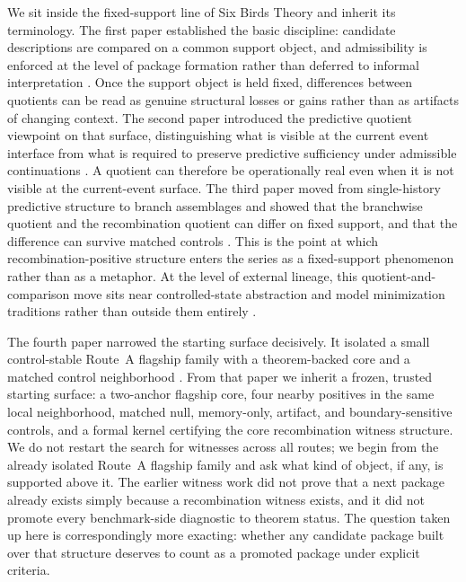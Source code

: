 \documentclass[11pt]{article}
\theoremstyle{definition}
\begin{document}
We sit inside the fixed-support line of Six Birds Theory and inherit its terminology. The first paper established the basic discipline: candidate descriptions are compared on a common support object, and admissibility is enforced at the level of package formation rather than deferred to informal interpretation \citep{Tsiokos2026EventPackages}. Once the support object is held fixed, differences between quotients can be read as genuine structural losses or gains rather than as artifacts of changing context. The second paper introduced the predictive quotient viewpoint on that surface, distinguishing what is visible at the current event interface from what is required to preserve predictive sufficiency under admissible continuations \citep{Tsiokos2026HolonomyMemory,Fisher1922,Blackwell1953,CrutchfieldYoung1989,ShaliziCrutchfield2001,LittmanSuttonSingh2001,Jaeger2000}. A quotient can therefore be operationally real even when it is not visible at the current-event surface. The third paper moved from single-history predictive structure to branch assemblages and showed that the branchwise quotient and the recombination quotient can differ on fixed support, and that the difference can survive matched controls \citep{Tsiokos2026MarkingErasureRecombination}. This is the point at which recombination-positive structure enters the series as a fixed-support phenomenon rather than as a metaphor. At the level of external lineage, this quotient-and-comparison move sits near controlled-state abstraction and model minimization traditions rather than outside them entirely \citep{DeanGivan1997,GivanDeanGreig2003,LiWalshLittman2006}.

The fourth paper narrowed the starting surface decisively. It isolated a small control-stable Route~A flagship family with a theorem-backed core and a matched control neighborhood \citep{Tsiokos2026RecombinationWitnesses}. From that paper we inherit a frozen, trusted starting surface: a two-anchor flagship core, four nearby positives in the same local neighborhood, matched null, memory-only, artifact, and boundary-sensitive controls, and a formal kernel certifying the core recombination witness structure. We do not restart the search for witnesses across all routes; we begin from the already isolated Route~A flagship family and ask what kind of object, if any, is supported above it. The earlier witness work did not prove that a next package already exists simply because a recombination witness exists, and it did not promote every benchmark-side diagnostic to theorem status. The question taken up here is correspondingly more exacting: whether any candidate package built over that structure deserves to count as a promoted package under explicit criteria.
\end{document}
